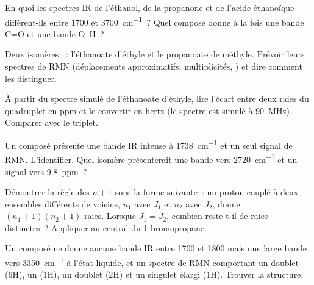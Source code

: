 \begin{exercise}[$\star\star$]\label{exo:b1:structure-spectroscopy:6}
En quoi les spectres IR de l'éthanol, de la propanone et de l'acide
éthanoïque diffèrent-ils entre 1700 et \qty{3700}{cm^{-1}}~? Quel
composé donne à la fois une bande C=O et une bande O--H~?
\end{exercise}

\begin{exercise}[$\star\star$]\label{exo:b1:structure-spectroscopy:7}
Deux isomères ~: l'éthanoate d'éthyle et le propanoate de
méthyle. Prévoir leurs spectres de RMN (déplacements approximatifs,
multiplicités, ) et dire comment les distinguer.
\end{exercise}

\begin{exercise}[$\star\star$]\label{exo:b1:structure-spectroscopy:8}
À partir du spectre simulé de l'éthanoate d'éthyle, lire l'écart entre
deux raies du quadruplet en ppm et le convertir en hertz (le spectre est
simulé à \qty{90}{MHz}). Comparer avec le triplet.
\end{exercise}

\begin{exercise}[$\star\star$]\label{exo:b1:structure-spectroscopy:9}
Un composé  présente une bande IR intense à
\qty{1738}{cm^{-1}} et un seul signal de RMN. L'identifier. Quel isomère
présenterait une bande vers \qty{2720}{cm^{-1}} et un signal vers
\qty{9.8}{ppm}~?
\end{exercise}

\begin{exercise}[$\star\star\star$]\label{exo:b1:structure-spectroscopy:10}
Démontrer la règle des $n + 1$ sous la forme suivante~: un proton couplé
à deux ensembles différents de voisins, $n_1$ avec $J_1$ et $n_2$ avec
$J_2$, donne $(n_1 +
1)(n_2 + 1)$ raies. Lorsque $J_1 = J_2$, combien reste-t-il de raies
distinctes~? Appliquer au  central du 1-bromopropane.
\end{exercise}

\begin{exercise}[$\star\star\star$]\label{exo:b1:structure-spectroscopy:11}
Un composé  ne donne aucune bande IR entre 1700 et 1800 mais
une large bande vers \qty{3350}{cm^{-1}} à l'état liquide, et un spectre
de RMN comportant un doublet (6H), un  (1H), un doublet (2H) et
un singulet élargi (1H). Trouver la structure.
\end{exercise}

